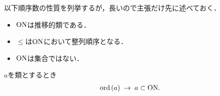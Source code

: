 	以下順序数の性質を列挙するが，長いので主張だけ先に述べておく．
	\begin{itemize}
		\item $\mathrm{ON}$は推移的類である．
		\item $\leq$は$\mathrm{ON}$において整列順序となる．
		\item $\mathrm{ON}$は集合ではない．
	\end{itemize}
	
	\begin{screen}
		\begin{thm}
		\label{thm:transitive_totally_ordered_class}
			$a$を類とするとき
			\begin{align}
				\operatorname*{ord}\hspace{0.15em}(a) \hspace{0.25em}\rightarrow\hspace{0.25em} a \subset \mathrm{ON}.
			\end{align}
		\end{thm}
	\end{screen}
	

